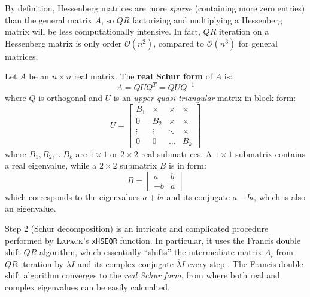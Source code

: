 \documentclass{article}
\begin{document}
By definition, Hessenberg matrices are more \textit{sparse} (containing more zero entries) than the general matrix $A$, so $QR$ factorizing and multiplying a Hessenberg matrix will be less computationally intensive. In fact, $QR$ iteration on a Hessenberg matrix is only order $\mathcal O(n^2)$, compared to $\mathcal O(n^3)$ for general matrices.
\begin{tcolorbox}[title={Real Schur form},colback=blue!5!white,colframe=blue!75!black,parbox=false]
	Let $A$ be an $n\times n$ real matrix. The \textbf{real Schur form} of $A$ is:
	\begin{equation*}
		A=QUQ^T=QUQ^{-1}
	\end{equation*}
	where $Q$ is orthogonal and $U$ is an \textit{upper quasi-triangular} matrix in block form:
	\begin{equation*}
	    U=\begin{bmatrix}
			B_1 & \times & \times & \times \\
			0 & B_2 & \times & \times \\
			\vdots & \vdots & \ddots & \times \\
			0 & 0 & \ldots & B_k
	    \end{bmatrix}
	\end{equation*}
	where $B_1,B_2,\ldots B_k$ are $1\times1$ or $2\times2$ real submatrices. A $1\times 1$ submatrix contains a real eigenvalue, while a $2\times 2$ submatrix $B$ is in form:
	\begin{equation*}
	    B=\begin{bmatrix}
			a & b \\
			-b & a
	    \end{bmatrix}
	\end{equation*}
	which corresponds to the eigenvalues $a+bi$ and its conjugate $a-bi$, which is also an eigenvalue.
\end{tcolorbox}
Step 2 (Schur decomposition) is an intricate and complicated procedure performed by \textsc{Lapack}'s \texttt{xHSEQR} function. In particular, it uses the Francis double shift $QR$ algorithm, which essentially ``shifts'' the intermediate matrix $A_i$ from $QR$ iteration by $\lambda I$ and its complex conjugate $\overline{\lambda} I$ every step \cite{byers,cornellnotes2}. The Francis double shift algorithm converges to the \textit{real Schur form}, from where both real and complex eigenvalues can be easily calcualted.
\end{document}

